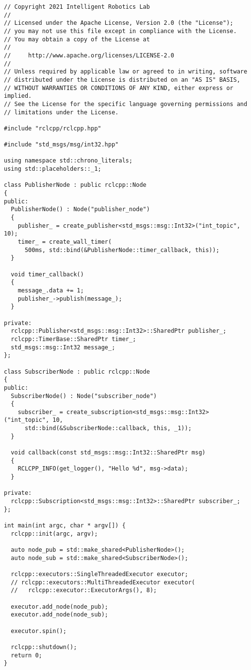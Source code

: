  \footnotesize
\begin{tcolorbox}[sharp corners, colframe=gray!80, colback=LightGray, left=0pt, top=0pt, bottom=0pt, title=\texttt{br2\_basics/src/executors.cpp}]
  \begin{verbatim}
// Copyright 2021 Intelligent Robotics Lab
//
// Licensed under the Apache License, Version 2.0 (the "License");
// you may not use this file except in compliance with the License.
// You may obtain a copy of the License at
//
//     http://www.apache.org/licenses/LICENSE-2.0
//
// Unless required by applicable law or agreed to in writing, software
// distributed under the License is distributed on an "AS IS" BASIS,
// WITHOUT WARRANTIES OR CONDITIONS OF ANY KIND, either express or implied.
// See the License for the specific language governing permissions and
// limitations under the License.

#include "rclcpp/rclcpp.hpp"

#include "std_msgs/msg/int32.hpp"

using namespace std::chrono_literals;
using std::placeholders::_1;

class PublisherNode : public rclcpp::Node
{
public:
  PublisherNode() : Node("publisher_node")
  {
    publisher_ = create_publisher<std_msgs::msg::Int32>("int_topic", 10);
    timer_ = create_wall_timer(
      500ms, std::bind(&PublisherNode::timer_callback, this));
  }

  void timer_callback()
  {
    message_.data += 1;
    publisher_->publish(message_);
  }

private:
  rclcpp::Publisher<std_msgs::msg::Int32>::SharedPtr publisher_;
  rclcpp::TimerBase::SharedPtr timer_;
  std_msgs::msg::Int32 message_;
};

class SubscriberNode : public rclcpp::Node
{
public:
  SubscriberNode() : Node("subscriber_node")
  {
    subscriber_ = create_subscription<std_msgs::msg::Int32>("int_topic", 10,
      std::bind(&SubscriberNode::callback, this, _1));
  }

  void callback(const std_msgs::msg::Int32::SharedPtr msg)
  {
    RCLCPP_INFO(get_logger(), "Hello %d", msg->data);
  }

private:
  rclcpp::Subscription<std_msgs::msg::Int32>::SharedPtr subscriber_;
};

int main(int argc, char * argv[]) {
  rclcpp::init(argc, argv);

  auto node_pub = std::make_shared<PublisherNode>();
  auto node_sub = std::make_shared<SubscriberNode>();

  rclcpp::executors::SingleThreadedExecutor executor;
  // rclcpp::executors::MultiThreadedExecutor executor(
  //   rclcpp::executor::ExecutorArgs(), 8);

  executor.add_node(node_pub);
  executor.add_node(node_sub);

  executor.spin();

  rclcpp::shutdown();
  return 0;
}    \end{verbatim}
    \end{tcolorbox}
  \normalsize

